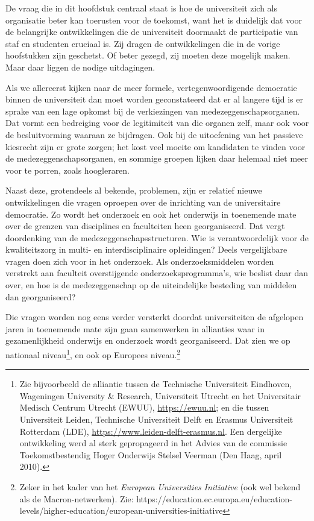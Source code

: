 \documentclass[smallauthor, chapterhaspagenum, nochapterinheader, pagenuminheader,  bigchapnum,medium2, tocpages, garamond, titleinheader]{jote-book}
\begin{document}
	De vraag die in dit hoofdstuk centraal staat is hoe de universiteit zich als organisatie beter kan toerusten voor de toekomst, want het is duidelijk dat voor de belangrijke ontwikkelingen die de universiteit doormaakt de participatie van staf en studenten cruciaal is. Zij dragen de ontwikkelingen die in de vorige hoofstukken zijn geschetst. Of beter gezegd, zij moeten deze mogelijk maken. Maar daar liggen de nodige uitdagingen.



	Als we allereerst kijken naar de meer formele, vertegenwoordigende democratie binnen de universiteit dan moet worden geconstateerd dat er al langere tijd is er sprake van een lage opkomst bij de verkiezingen van medezeggenschapsorganen. Dat vormt een bedreiging voor de legitimiteit van die organen zelf, maar ook voor de besluitvorming waaraan ze bijdragen. Ook bij de uitoefening van het passieve kiesrecht zijn er grote zorgen; het kost veel moeite om kandidaten te vinden voor de medezeggenschapsorganen, en sommige groepen lijken daar helemaal niet meer voor te porren, zoals hoogleraren.



	Naast deze, grotendeels al bekende, problemen, zijn er relatief nieuwe ontwikkelingen die vragen oproepen over de inrichting van de universitaire democratie. Zo wordt het onderzoek en ook het onderwijs in toenemende mate over de grenzen van disciplines en faculteiten heen georganiseerd. Dat vergt doordenking van de medezeggenschapsstructuren. Wie is verantwoordelijk voor de kwaliteitszorg in multi- en interdisciplinaire opleidingen? Deels vergelijkbare vragen doen zich voor in het onderzoek. Als onderzoeksmiddelen worden verstrekt aan faculteit overstijgende onderzoeksprogramma's, wie beslist daar dan over, en hoe is de medezeggenschap op de uiteindelijke besteding van middelen dan georganiseerd?



	Die vragen worden nog eens verder versterkt doordat universiteiten de afgelopen jaren in toenemende mate zijn gaan samenwerken in allianties waar in gezamenlijkheid onderwijs en onderzoek wordt georganiseerd. Dat zien we op nationaal niveau\footnote{Zie bijvoorbeeld de alliantie tussen de Technische Universiteit Eindhoven, Wageningen University \& Research, Universiteit Utrecht en het Universitair Medisch Centrum Utrecht (EWUU), \href{https://www.leiden-delft-erasmus.nl}{https://ewuu.nl}; en die tussen Universiteit Leiden, Technische Universiteit Delft en Erasmus Universiteit Rotterdam (LDE), \href{https://ewuu.nl}{https://www.leiden-delft-erasmus.nl}. Een dergelijke ontwikkeling werd al sterk gepropageerd in het Advies van de commissie Toekomstbestendig Hoger Onderwijs Stelsel Veerman (Den Haag, april 2010).}, en ook op Europees niveau.\footnote{Zeker in het kader van het \emph{European }\emph{Universities}\emph{ }\emph{Initiative} (ook wel bekend als de Macron-netwerken). Zie: https://education.ec.europa.eu/education-levels/higher-education/european-universities-initiative}
\end{document}
